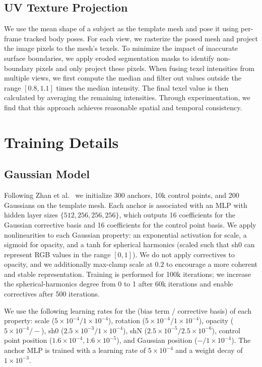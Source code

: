 \documentclass[runningheads]{llncs}
\begin{document}
\subsection{UV Texture Projection}

We use the mean shape of a subject as the template mesh and pose it using per-frame tracked body poses.
For each view, we rasterize the posed mesh and project the image pixels to the mesh's texels.
To minimize the impact of inaccurate surface boundaries, we apply eroded segmentation masks to identify non-boundary pixels and only project these pixels.
When fusing texel intensities from multiple views, we first compute the median and filter out values outside the range $[0.8, 1.1]$ times the median intensity. 
The final texel value is then calculated by averaging the remaining intensities. Through experimentation, we find that this approach achieves reasonable spatial and temporal consistency.

\section{Training Details}

\subsection{Gaussian Model}

Following Zhan et al.~\cite{zhan2025spatialmlps} we initialize 300 anchors, 10k control points, and 200 Gaussians on the template mesh.
Each anchor is associated with an MLP with hidden layer sizes $\{512,256,256,256\}$, which outputs 16 coefficients for the Gaussian corrective basis and 16 coefficients for the control point basis.
We apply nonlinearities to each Gaussian property: an exponential activation for scale, a sigmoid for opacity, and a tanh for spherical harmonics (scaled such that sh0 can represent RGB values in the range $[0,1]$).
We do not apply correctives to opacity, and we additionally max-clamp scale at $0.2$ to encourage a more coherent and stable representation.
Training is performed for 100k iterations; we increase the spherical-harmonics degree from 0 to 1 after 60k iterations and enable correctives after 500 iterations.

We use the following learning rates for the (bias term / corrective basis) of each property: scale ($5{\times}10^{-4}/1{\times}10^{-4}$), rotation ($5{\times}10^{-4}/1{\times}10^{-4}$), opacity ($5{\times}10^{-4}/-$), sh0 ($2.5{\times}10^{-3}/1{\times}10^{-4}$), shN ($2.5{\times}10^{-5}/2.5{\times}10^{-6}$), control point position ($1.6{\times}10^{-4},1.6{\times}10^{-5}$), and Gaussian position ($-/1{\times}10^{-4}$).
The anchor MLP is trained with a learning rate of $5{\times}10^{-4}$ and a weight decay of $1{\times}10^{-3}$.
\end{document}
